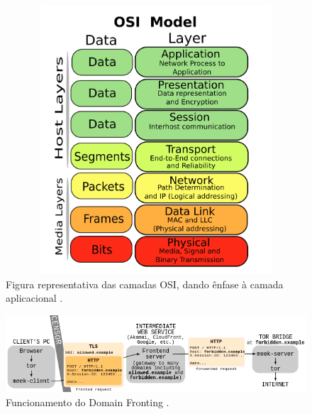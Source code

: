\begin{figure}[H]
\begin{center}
\includegraphics[width=12cm,height=10cm]{img/OSI.png}
\caption{Figura representativa das camadas OSI, dando ênfase à camada aplicacional \cite{OSI}.}
\label{diagram:OSI}
\centering
\end{center}
\end{figure}

\begin{figure}[H]
\begin{center}
\includegraphics[width=15cm]{img/domainFronting.png}
\caption{Funcionamento do Domain Fronting \cite{df}.}
\label{diagram:domainFronting}
\centering
\end{center}
\end{figure}
